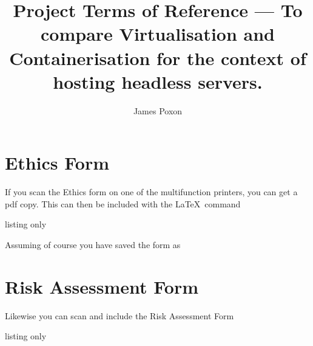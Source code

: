 \documentclass[12pt]{article}
\title{Project Terms of Reference --- To compare Virtualisation and Containerisation for the context of hosting headless servers.}
\author{James Poxon}
\begin{document}
\maketitle




\appendix

\section{Ethics Form}
If you scan the Ethics form on one of the multifunction printers, you can get a pdf copy.  This can then be included with the \LaTeX\ command
\begin{tcblisting}{listing only}

\end{tcblisting}
Assuming of course you have saved the form  as 


\section{Risk Assessment Form}
Likewise you can scan and include the Risk Assessment Form
\begin{tcblisting}{listing only}

\end{tcblisting}
\end{document}
